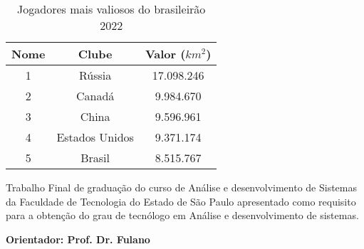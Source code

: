 \documentclass[12pt,a4paper]{book}
\begin{document}
\begin{table}[h]
\centering
\caption{Jogadores mais valiosos do brasileirão 2022}
\vspace{0.5cm}
\begin{tabular}{c|cc}
Nome & Clube & Valor ($km^2$) \\
\hline
1 & Rússia & 17.098.246 \\
2 & Canadá & 9.984.670 \\
3 & China & 9.596.961 \\
4 & Estados Unidos & 9.371.174 \\
5 & Brasil & 8.515.767
\end{tabular}
\end{table}

\begin{flushright}
\begin{minipage}[t]{12cm}
\hrulefill

Trabalho Final de graduação do curso de Análise e desenvolvimento de Sistemas da Faculdade de Tecnologia do Estado de São Paulo
apresentado como requisito para a obtenção do grau de tecnólogo em Análise e desenvolvimento de sistemas.

\hrulefill

\vspace{0.2cm}

{\bf Orientador: Prof. Dr. Fulano}
\end{minipage}
\end{flushright}

\newpage
\end{document}
